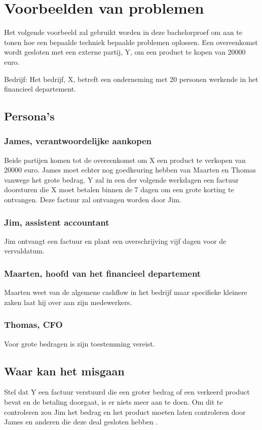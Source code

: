 \chapter{Voorbeelden van problemen}
\label{ch:voorbeelden-van-problemen}

Het volgende voorbeeld zal gebruikt worden in deze bachelorproef om aan te tonen
hoe een bepaalde techniek bepaalde problemen oplossen.
Een overeenkomst wordt gesloten met een externe partij, Y, om een product te
kopen van 20000 euro.

Bedrijf: Het bedrijf, X, betreft een onderneming met 20 personen werkende in het
financieel departement.

\section{Persona’s}

\subsection{James, verantwoordelijke aankopen}
Beide partijen komen tot de overeenkomst om X een product te verkopen van 20000
euro. James moet echter nog goedkeuring hebben van Maarten en Thomas vanwege het
grote bedrag. Y zal in een der volgende werkdagen een factuur doorsturen die X
moet betalen binnen de 7 dagen om een grote korting te ontvangen. Deze factuur
zal ontvangen worden door Jim.

\subsection{Jim, assistent accountant}
Jim ontvangt een factuur en plant een overschrijving vijf dagen voor de
vervaldatum.

\subsection{Maarten, hoofd van het financieel departement}
Maarten weet van de algemene cashflow in het bedrijf maar specifieke kleinere
zaken laat hij over aan zijn medewerkers.

\subsection{Thomas, CFO}
Voor grote bedragen is zijn toestemming vereist.

\section{Waar kan het misgaan}
Stel dat Y een factuur verstuurd die een groter bedrag of een verkeerd product
bevat en de betaling doorgaat, is er niets meer aan te doen. Om dit te
controleren zou Jim het bedrag en het product moeten laten controleren door
James en anderen die deze deal gesloten hebben \autocite{VanDenBulckeTom}.

